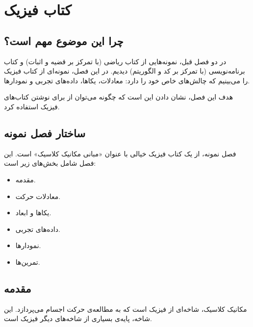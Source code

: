 
\chapter{کتاب فیزیک}
\label{chap:physics-book}

\section{چرا این موضوع مهم است؟}
\label{sec:physics-book-why}

در دو فصل قبل، نمونه‌هایی از کتاب ریاضی
(با تمرکز بر قضیه و اثبات) و کتاب
برنامه‌نویسی (با تمرکز بر کد و الگوریتم)
دیدیم. در این فصل، نمونه‌ای از کتاب
فیزیک را می‌بینیم که چالش‌های خاص خود
را دارد: معادلات، یکاها، داده‌های تجربی
و نمودارها.

هدف این فصل، نشان دادن این است که چگونه
می‌توان از  برای نوشتن
کتاب‌های فیزیک استفاده کرد.


\section{ساختار فصل نمونه}
\label{sec:physics-book-structure}

فصل نمونه، از یک کتاب فیزیک خیالی با
عنوان «مبانی مکانیک کلاسیک» است. این
فصل شامل بخش‌های زیر است:

\begin{itemize}
    \item مقدمه.
    \item معادلات حرکت.
    \item یکاها و ابعاد.
    \item داده‌های تجربی.
    \item نمودارها.
    \item تمرین‌ها.
\end{itemize}

\section{مقدمه}
\label{sec:physics-book-intro}

مکانیک کلاسیک،
شاخه‌ای از فیزیک است که به مطالعه‌ی حرکت
اجسام می‌پردازد. این شاخه، پایه‌ی بسیاری
از شاخه‌های دیگر فیزیک است.

